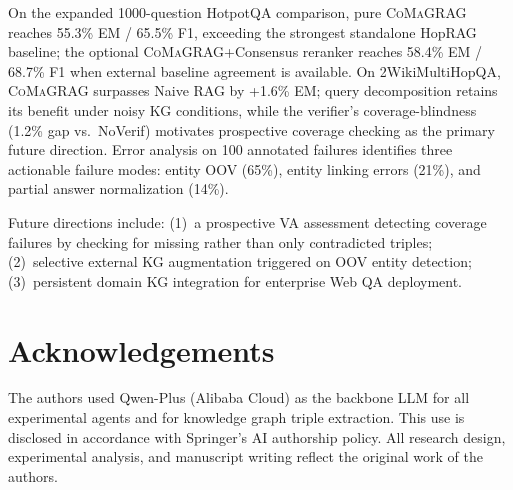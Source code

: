 \documentclass[runningheads]{llncs}
\newcommand{\sys}{\textsc{CoMaGRAG}\xspace}
\begin{document}
On the expanded 1000-question HotpotQA comparison, pure \sys reaches
55.3\% EM / 65.5\% F1, exceeding the strongest standalone HopRAG baseline; the
optional \sys+Consensus reranker reaches 58.4\% EM / 68.7\% F1 when external
baseline agreement is available. On 2WikiMultiHopQA, \sys surpasses
Naive RAG by +1.6\% EM; query decomposition retains its benefit under noisy KG
conditions, while the verifier's coverage-blindness (1.2\% gap vs.\ NoVerif)
motivates prospective coverage checking as the primary future direction. Error
analysis on 100 annotated failures identifies three actionable failure modes:
entity OOV (65\%), entity linking errors (21\%), and partial answer
normalization (14\%).

Future directions include: (1)~a prospective VA assessment detecting coverage
failures by checking for missing rather than only contradicted triples;
(2)~selective external KG augmentation triggered on OOV entity detection;
(3)~persistent domain KG integration for enterprise Web QA deployment.

\section*{Acknowledgements}

The authors used Qwen-Plus (Alibaba Cloud) as the backbone LLM for all experimental
agents and for knowledge graph triple extraction. This use is disclosed in
accordance with Springer's AI authorship policy. All research design,
experimental analysis, and manuscript writing reflect the original work of the
authors.



\end{document}
